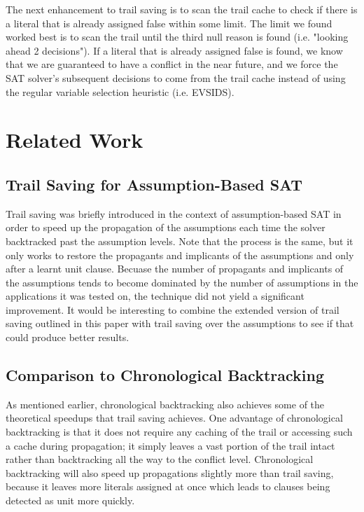 \documentclass{article}
\begin{document}
The next enhancement to trail saving is to scan the trail cache to check if there is a literal that is already assigned false within some limit. The limit we found worked best is to scan the trail until the third null reason is found (i.e. "looking ahead 2 decisions"). If a literal that is already assigned false is found, we know that we are guaranteed to have a conflict in the near future, and we force the SAT solver's subsequent decisions to come from the trail cache instead of using the regular variable selection heuristic (i.e. EVSIDS).

\section{Related Work}
\subsection{Trail Saving for Assumption-Based SAT}
Trail saving was briefly introduced in the context of assumption-based SAT \cite{DBLP:conf/sat/HickeyB19} in order to speed up the propagation of the assumptions each time the solver backtracked past the assumption levels. Note that the process is the same, but it only works to restore the propagants and implicants of the assumptions and only after a learnt unit clause. Becuase the number of propagants and implicants of the assumptions tends to become dominated by the number of assumptions in the applications it was tested on, the technique did not yield a significant improvement. It would be interesting to combine the extended version of trail saving outlined in this paper with trail saving over the assumptions to see if that could produce better results. 

\subsection{Comparison to Chronological Backtracking}
As mentioned earlier, chronological backtracking also achieves some of the theoretical speedups that trail saving achieves. One advantage of chronological backtracking is that it does not require any caching of the trail or accessing such a cache during propagation; it simply leaves a vast portion of the trail intact rather than backtracking all the way to the conflict level. Chronological backtracking will also speed up propagations slightly more than trail saving, because it leaves more literals assigned at once which leads to clauses being detected as unit more quickly.
\end{document}
